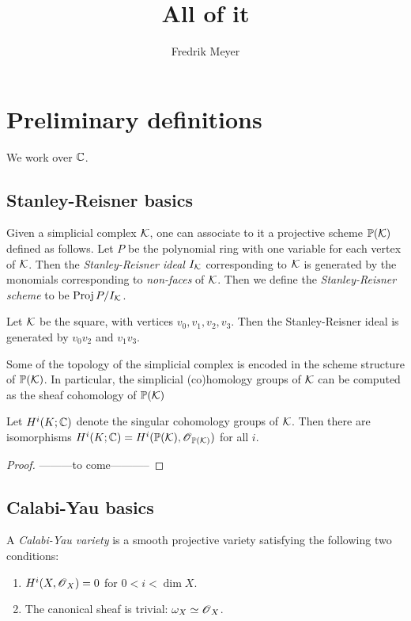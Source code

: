 \documentclass[11pt, english]{book}
\begin{document}
\title{All of it}
\author{Fredrik Meyer}
\maketitle 

\chapter{Preliminary definitions}

We work over $\mathbb{C}$. 

\section{Stanley-Reisner basics}

Given a simplicial complex $\mathcal K$, one can associate to it a projective scheme $\mathbb{P}(\mathcal K)$ defined as follows. Let $P$ be the polynomial ring with one variable for each vertex of $\mathcal K$. Then the \emph{Stanley-Reisner ideal $I_\mathcal K$} corresponding to $\mathcal K$ is generated by the monomials corresponding to \emph{non-faces} of $\mathcal K$. Then we define the \emph{Stanley-Reisner scheme} to be $\operatorname{Proj} P/I_\mathcal K$. 

\begin{example}
Let $\mathcal K$ be the square, with vertices $v_0,v_1,v_2,v_3$. Then the Stanley-Reisner ideal is generated by $v_0v_2$ and $v_1v_3$.
\end{example}

Some of the topology of the simplicial complex is encoded in the scheme structure of $\mathbb{P}(\mathcal K)$. In particular, the simplicial (co)homology groups of $\mathcal K$ can be computed as the sheaf cohomology of $\mathbb{P}(\mathcal K)$

\begin{lemma}
Let $H^i(K;\mathbb{C})$ denote the singular cohomology groups of $\mathcal K$. Then there are isomorphisms $H^i(K;\mathbb{C})=H^i(\mathbb{P}(\mathcal K),\operatorname{\mathscr{O}}_{\mathbb{P}(\mathcal K)})$ for all $i$.
\end{lemma}
\begin{proof}
---------to come-----------
\end{proof}

\section{Calabi-Yau basics}

\begin{defi}
A \emph{Calabi-Yau variety} is a smooth projective variety satisfying the following two conditions:
\begin{enumerate}
	\item $H^i(X,\operatorname{\mathscr{O}}_X)=0$ for $0 < i < \dim X$.
	\item The canonical sheaf is trivial: $\omega_X \simeq \operatorname{\mathscr{O}}_X$. 
\end{enumerate}
\end{defi}
\end{document}
